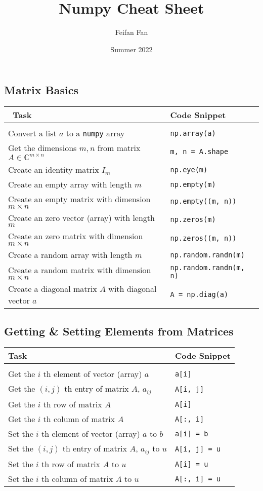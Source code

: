 \documentclass[a4paper,11pt]{article}
\begin{document}
\title{Numpy Cheat Sheet}
\author{Feifan Fan}
\date{Summer 2022}
\maketitle
\subsection*{Matrix Basics}
\begin{tabular}{p{9cm} |p{5cm}}\
Task & Code Snippet \\
\hline \\
Convert a list $a$ to a \texttt{numpy} array & \texttt{np.array(a)} \\
Get the dimensions \(m, n\) from matrix \(A \in \mathbb{C}^{m\times n}\) & \texttt{m, n = A.shape} \\
Create an identity matrix \(I_m\) & \texttt{np.eye(m)}  \\
Create an empty array with length $m$ & \texttt{np.empty(m)}  \\
Create an empty matrix with dimension $m \times  n$ & \texttt{np.empty((m, n))}\\
Create an zero vector (array) with length \(m\) & \texttt{np.zeros(m)} \\
Create an zero matrix with dimension \(m \times n\)& \texttt{np.zeros((m, n))}\\
Create a random array with length $m$ & \texttt{np.random.randn(m)}  \\
Create a random matrix with dimension \(m \times n\)& \texttt{np.random.randn(m, n)}\\
Create a diagonal matrix $A$ with diagonal vector $a$ &  \texttt{A = np.diag(a)} \\
\end{tabular}
\subsection*{Getting \& Setting Elements from Matrices}
\begin{tabular}{p{9cm} |p{5cm}}
  Task & Code Snippet \\
  \hline \\
Get the $i$ th element of vector (array) $a$ & \texttt{a[i]} \\
Get the $(i, j)$ th entry of matrix $A$,  $a_{ij}$ &  \texttt{A[i, j]}\\
Get the $i$ th row of matrix $A$ & \texttt{A[i]} \\
Get the $i$ th column of matrix $A$ &  \texttt{A[:, i]}\\
Set the $i$ th element of vector (array) $a$ to $b$ & \texttt{a[i] = b} \\
Set the $(i, j)$ th entry of matrix $A$,  $a_{ij}$ to $u$&  \texttt{A[i, j] = u}\\
Set the $i$ th row of matrix $A$ to $u$ & \texttt{A[i] = u}\\
Set the $i$ th column of matrix $A$ to $u$ & \texttt{A[:, i] = u} \\
\end{tabular}
\newpage
\end{document}
